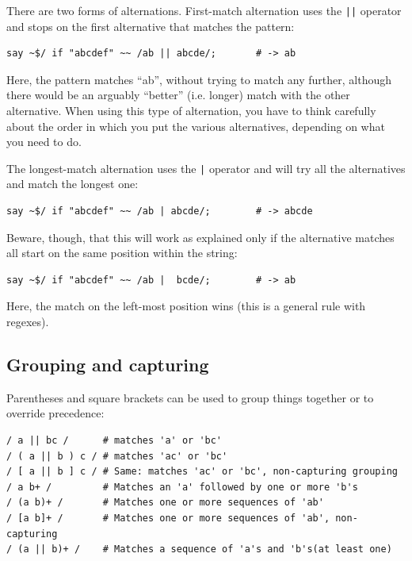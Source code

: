 There are two forms of alternations. First-match alternation 
uses the \verb'||' operator and stops on the first alternative 
that matches the pattern:

\begin{verbatim}
say ~$/ if "abcdef" ~~ /ab || abcde/;       # -> ab
\end{verbatim}
%

Here, the pattern matches ``ab'', without trying to match 
any further, although there would be an arguably ``better'' 
(i.e. longer) match with the other alternative. When using 
this type of alternation, you have to think carefully about 
the order in which you put the various alternatives, 
depending on what you need to do.

The longest-match alternation uses the \verb'|' operator 
and will try all the alternatives and match the longest one:

\begin{verbatim}
say ~$/ if "abcdef" ~~ /ab | abcde/;        # -> abcde
\end{verbatim}
%

Beware, though, that this will work as explained only if 
the alternative matches all start on the same position 
within the string:

\begin{verbatim}
say ~$/ if "abcdef" ~~ /ab |  bcde/;        # -> ab
\end{verbatim}
%

Here, the match on the left-most position wins (this is 
a general rule with regexes).


\subsection{Grouping and capturing}

Parentheses and square brackets can be used to group 
things together or to override precedence:

\begin{verbatim}
/ a || bc /      # matches 'a' or 'bc'
/ ( a || b ) c / # matches 'ac' or 'bc'
/ [ a || b ] c / # Same: matches 'ac' or 'bc', non-capturing grouping
/ a b+ /         # Matches an 'a' followed by one or more 'b's
/ (a b)+ /       # Matches one or more sequences of 'ab'
/ [a b]+ /       # Matches one or more sequences of 'ab', non-capturing
/ (a || b)+ /    # Matches a sequence of 'a's and 'b's(at least one)
\end{verbatim}
%

